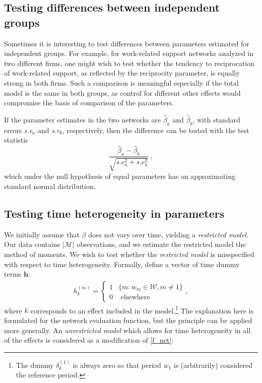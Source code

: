 \documentclass[a4paper,fleqn]{article}
\newcommand{\+}{\, + \,}
\begin{document}
{\subsection{Testing differences between independent groups}

Sometimes it is interesting to test differences between parameters estimated for
independent groups. For example, for work-related support networks analyzed in
two different firms, one might wish to test whether the tendency to
reciprocation of work-related support, as reflected by the reciprocity
parameter, is equally strong in both firms.  Such a comparison is meaningful
especially if the total model is the same in both groups, as control for
different other effects would compromise the basis of comparison of the
parameters.

If the parameter estimates in the two networks are $\hat\beta_a$ and $\hat\beta_b$,
with standard errors \textit{s.e}$_a$ and  \textit{s.e}$_b$, respectively,
then the difference can be tested with the test statistic
\begin{equation}
    \frac{\hat\beta_a  - \hat\beta_b}{\sqrt{s.e_a^2 + s.e_b^2}} \ ,
\end{equation}
which under the null hypothesis of equal parameters has an approximating
standard normal distribution.

\newpage
\subsection{Testing time heterogeneity in parameters}
\label{S_timetest2}

We initially assume that $\beta$ does not vary over time, yielding a
\emph{restricted model}. Our data contains $|\mathcal{M}|$ observations, and we
estimate the restricted model the method of moments. We wish to test whether the
\emph{restricted model} is misspecified with respect to time
heterogeneity. Formally, define a vector of time dummy terms $\mathbf{h}$:
\begin{align}
h_k^{(m)}=\left\{
\begin{array}{ll}
1& \{m : w_m \in \mathcal{W}, m \neq 1\}\\
0& \mbox{~elsewhere~}
\end{array}
\right . ,
\end{align}
where $k$ corresponds to an effect included in the model.\footnote{The dummy
  $\delta_k^{(1)}$ is always zero so that period $w_1$ is (arbitrarily)
  considered the reference period.} The explanation here
is formulated for the network evaluation function,
but the principle can be applied more generally.
An \emph{unrestricted model} which allows
for time heterogeneity in all of the effects is considered as a modification of
\eqref{f_net}:

}
\end{document}
